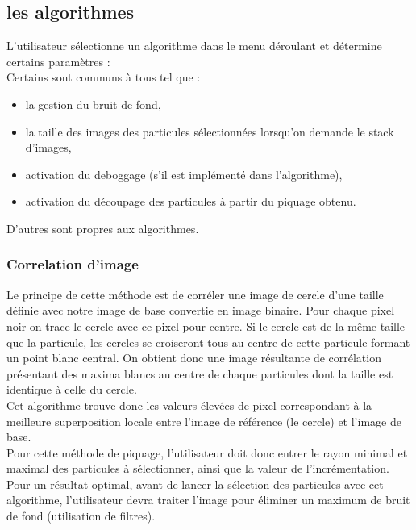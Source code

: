 \subsection{les algorithmes}
L'utilisateur sélectionne un algorithme dans le menu déroulant et détermine certains paramètres :\\
Certains sont communs à tous tel que :
\begin{itemize}
\item la gestion du bruit de fond,
\item la taille des images des particules sélectionnées lorsqu'on demande le stack d'images,
\item activation du deboggage (s'il est implémenté dans l'algorithme),
\item activation du découpage des particules à partir du piquage obtenu.
\end{itemize}
D'autres sont propres aux algorithmes.
\subsubsection{Correlation d'image}
Le principe de cette méthode est de corréler une image de cercle d'une taille définie avec notre image de base convertie en image binaire. Pour chaque pixel noir on trace le cercle avec ce pixel pour centre.
Si le cercle est de la m\^eme taille que la particule, les cercles se croiseront tous au centre de cette particule formant un point blanc central. On obtient donc une image résultante de corrélation présentant des maxima blancs au centre de chaque particules dont la taille est identique à celle du cercle.\\
Cet algorithme trouve donc les valeurs élevées de pixel correspondant à la meilleure superposition locale entre l'image de référence (le cercle) et l'image de base.\\

\noindent
Pour cette méthode de piquage, l'utilisateur doit donc entrer le rayon minimal et maximal des particules à sélectionner, ainsi que la valeur de l'incrémentation.\\ Pour un résultat optimal, avant de lancer la sélection des particules avec cet algorithme, l'utilisateur devra traiter l'image pour éliminer un maximum de bruit de fond (utilisation de filtres).


